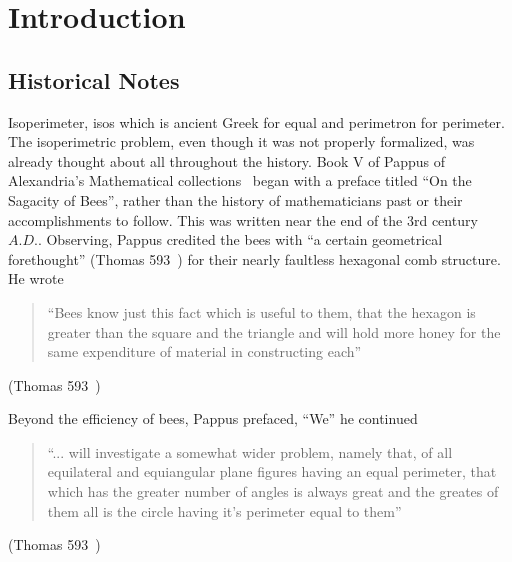 \documentclass[a4paper]{book}
\numberwithin{theorem}{section}%
\begin{document}
\chapter{Introduction}
\section{Historical Notes}
Isoperimeter, isos which is ancient Greek for equal and perimetron for perimeter. The isoperimetric problem, even though it was not properly formalized, was already thought about all throughout the history. 
\newline
\newline
Book V of Pappus of Alexandria's Mathematical collections~\citep{wiegert2010sagacity} began with a preface titled ``On the Sagacity of Bees'', rather than the history of mathematicians past or their accomplishments to follow. This was written near the end of the 3rd century $A.D.$. Observing, Pappus credited the bees with ``a certain geometrical forethought'' (Thomas 593~\citep{ivor1941selections}) for their nearly faultless hexagonal comb structure. He wrote
\begin{center}
    \begin{quote}
        ``Bees know just this fact which is useful to them, that 
        the hexagon is greater than the square and the triangle 
        and will hold more honey for the same expenditure of 
        material in constructing each''
    \end{quote}
    (Thomas 593~\citep{ivor1941selections})
\end{center}
Beyond the efficiency of bees, Pappus prefaced, ``We'' he continued
\begin{center}
    \begin{quote}
        ``... will {}investigate a somewhat wider problem, namely that, 
        of all equilateral and equiangular plane figures having an equal 
        perimeter, that which has the greater number of angles is always great 
        and the greates of them all is the circle having it's perimeter equal to them''
    \end{quote}
    (Thomas 593~\citep{ivor1941selections})
\end{center}
\end{document}
